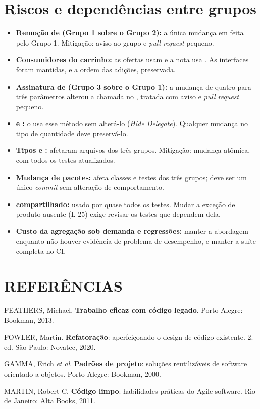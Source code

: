 \section{Riscos e dependências entre grupos}

\begin{itemize}
\item \textbf{Remoção de  (Grupo 1 sobre o Grupo 2):} a única mudança em  feita pelo Grupo 1. Mitigação: aviso ao grupo e \textit{pull request} pequeno.
\item \textbf{Consumidores do carrinho:} as ofertas usam  e a nota usa . As interfaces foram mantidas, e a ordem das adições, preservada.
\item \textbf{Assinatura de  (Grupo 3 sobre o Grupo 1):} a mudança de quatro para três parâmetros alterou a chamada no , tratada com aviso e \textit{pull request} pequeno.
\item \textbf{ e :} o  usa esse método sem alterá-lo (\textit{Hide Delegate}). Qualquer mudança no tipo de quantidade deve preservá-lo.
\item \textbf{Tipos  e :} afetaram arquivos dos três grupos. Mitigação: mudança atômica, com todos os testes atualizados.
\item \textbf{Mudança de pacotes:} afeta classes e testes dos três grupos; deve ser um único \textit{commit} sem alteração de comportamento.
\item \textbf{ compartilhado:} usado por quase todos os testes. Mudar a exceção de produto ausente (L-25) exige revisar os testes que dependem dela.
\item \textbf{Custo da agregação sob demanda e regressões:} manter a abordagem enquanto não houver evidência de problema de desempenho, e manter a suíte completa no CI.
\end{itemize}

\newpage
\section*{REFERÊNCIAS}
\begin{singlespace}\raggedright\noindent
FEATHERS, Michael. \textbf{Trabalho eficaz com código legado}. Porto Alegre: Bookman, 2013.

\vspace{12pt}\noindent FOWLER, Martin. \textbf{Refatoração}: aperfeiçoando o design de código existente. 2. ed. São Paulo: Novatec, 2020.

\vspace{12pt}\noindent GAMMA, Erich \textit{et al}. \textbf{Padrões de projeto}: soluções reutilizáveis de software orientado a objetos. Porto Alegre: Bookman, 2000.

\vspace{12pt}\noindent MARTIN, Robert C. \textbf{Código limpo}: habilidades práticas do Agile software. Rio de Janeiro: Alta Books, 2011.
\end{singlespace}

